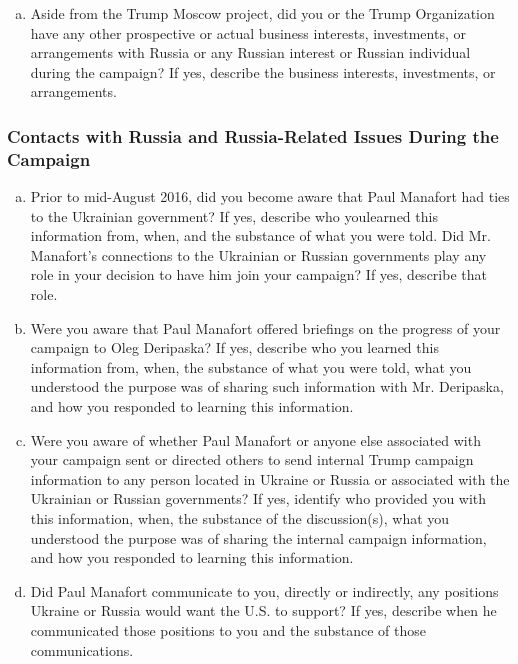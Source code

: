 \begin{enumerate}[a.]
\item Aside from the Trump Moscow project, did you or the Trump Organization have any other prospective or actual business interests, investments, or arrangements with Russia or any Russian interest or Russian individual during the campaign?
If yes, describe the business interests, investments, or arrangements.

\end{enumerate}

\subsubsection{Contacts with Russia and Russia-Related Issues During the Campaign}

\begin{enumerate}[a.]

\item Prior to mid-August 2016, did you become aware that Paul Manafort had ties to the Ukrainian government?
If yes, describe who youlearned this information from, when, and the substance of what you were told.
Did Mr. Manafort’s connections to the Ukrainian or Russian governments play any role in your decision to have him join your campaign?
If yes, describe that role.

\item Were you aware that Paul Manafort offered briefings on the progress of your campaign to Oleg Deripaska?
If yes, describe who you learned this information from, when, the substance of what you were told, what you understood the purpose was of sharing such information with Mr. Deripaska, and how you responded to learning this information.

\item Were you aware of whether Paul Manafort or anyone else associated with your campaign sent or directed others to send internal Trump campaign information to any person located in Ukraine or Russia or associated with the Ukrainian or Russian governments?
If yes, identify who provided you with this information, when, the substance of the discussion(s), what you understood the purpose was of sharing the internal campaign information, and how you responded to learning this information.

\item Did Paul Manafort communicate to you, directly or indirectly, any positions Ukraine or Russia would want the U.S. to support?
If yes, describe when he communicated those positions to you and the substance of those communications.


\end{enumerate}
